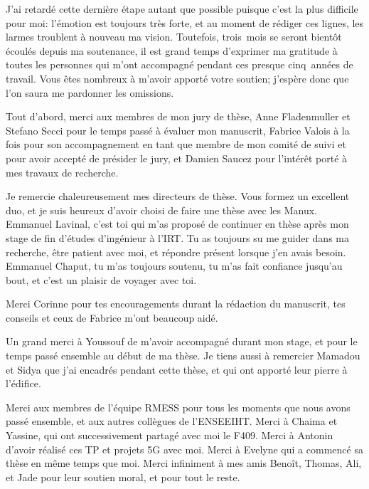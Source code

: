 \documentclass[../main.tex]{subfiles}
\begin{document}
\begin{acknowledgements}

J’ai retardé cette dernière étape autant que possible puisque c’est la plus difficile pour moi: l’émotion est toujours très forte, et au moment de rédiger ces lignes, les larmes troublent à nouveau ma vision. Toutefois, trois~mois se seront bientôt écoulés depuis ma soutenance, il est grand temps d’exprimer ma gratitude à toutes les personnes qui m’ont accompagné pendant ces presque cinq~années de travail.
Vous êtes nombreux à m’avoir apporté votre soutien; j’espère donc que l’on saura me pardonner les omissions.

Tout d’abord, merci aux membres de mon jury de thèse, Anne Fladenmuller et Stefano Secci pour le temps passé à évaluer mon manuscrit, Fabrice Valois à la fois pour son accompagnement en tant que membre de mon comité de suivi et pour avoir accepté de présider le jury, et Damien Saucez pour l’intérêt porté à mes travaux de recherche.

Je remercie chaleureusement mes directeurs de thèse. Vous formez un excellent duo, et je suis heureux d’avoir choisi de faire une thèse avec les Manux. Emmanuel Lavinal, c’est toi qui m’as proposé de continuer en thèse après mon stage de fin d’études d’ingénieur à l’IRT. Tu as toujours su me guider dans ma recherche, être patient avec moi, et répondre présent lorsque j’en avais besoin. Emmanuel Chaput, tu m’as toujours soutenu, tu m’as fait confiance jusqu’au bout, et c’est un plaisir de voyager avec toi.

Merci Corinne pour tes encouragements durant la rédaction du manuscrit, tes conseils et ceux de Fabrice m’ont beaucoup aidé.

Un grand merci à Youssouf de m’avoir accompagné durant mon stage, et pour le temps passé ensemble au début de ma thèse.
Je tiens aussi à remercier Mamadou et Sidya que j’ai encadrés pendant cette thèse, et qui ont apporté leur pierre à l’édifice.

Merci aux membres de l’équipe RMESS pour tous les moments que nous avons passé ensemble, et aux autres collègues de l’ENSEEIHT.
Merci à Chaima et Yassine, qui ont successivement partagé avec moi le F409.
Merci à Antonin d’avoir réalisé ces TP et projets 5G avec moi.
Merci à Evelyne qui a commencé sa thèse en même temps que moi.
Merci infiniment à mes amis Benoît, Thomas, Ali, et Jade pour leur soutien moral, et pour tout le reste.


\end{acknowledgements}
\end{document}
